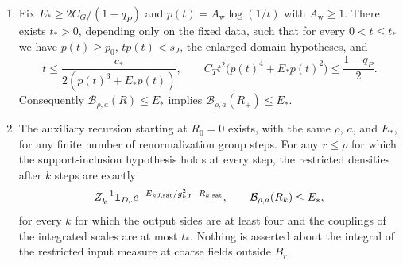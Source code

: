 \begin{theorem}
\begin{enumerate}
\begin{equation}\label{ch10:eq:recursion-domain}
 0<t\le\frac{c_*}{2(p^3+\epsilon p)}.
\end{equation}
Then, with $R_{\mathrm{aux}}=c_*/(p^3+\epsilon p)$, for every complex $\zeta$ with $\abs\zeta\le R_{\mathrm{aux}}$ and every $w\in\Omega_p$ the variables $\zeta\lambda_iw_i$ lie in the enlarged product of \cref{ch10:thm:whole-image-gauge}, the conditions \eqref{ch09:eq:sequential-conditions} hold at $(t,p)$, and the supported families of the auxiliary interaction and of the inserted interaction constructed in the proof lie in the ball of radius $\eta_0/2$ of \cref{ch09:thm:supported-log-holomorphy}. Under these conditions, apart from the field-independent factor $A_{\mathrm{coord}}$, the output effective interaction is
\begin{equation}\label{ch10:eq:one-step-recursion}
 R_+=Q_{d_0,J}^{\mathrm w}+\mathcal P_\delta R+\mathcal D_JR,\qquad
 \mathcal B_{\rho,a}(R_+)\le C_G+q_P\epsilon+C_Tt^2\epsilon(p^4+\epsilon p^2).
\end{equation}
Here $\mathcal P_\delta R(\theta)=R(e^{\varphi_\theta(0)})=R(e^{\delta\overline A_{d_0,J}(\theta)})$ is the pullback at the zero-fluctuation reconstruction, $\mathcal D_JR$ is the difference of the logarithms of the fluctuation partition functions without and with the inserted interaction, as in \cref{ch09:lem:marked-insertion} at the parameter $t$, and $Q_{d_0,J}^{\mathrm w}$ is the effective interaction of \cref{ch09:thm:sequential-density}. The output $R_+$ is gauge invariant on $B_\rho$, invariant under translations, the spatial inversion, and constant color conjugations, and $DR_+(I)=0$. Coupling parameters internal to $R$ are held fixed when the auxiliary parameter varies.
\item Fix $E_*\ge2C_G/(1-q_P)$ and $p(t)=A_{\mathrm w}\log(1/t)$ with $A_{\mathrm w}\ge1$. There exists $t_*>0$, depending only on the fixed data, such that for every $0<t\le t_*$ we have $p(t)\ge p_0$, $tp(t)<s_J$, the enlarged-domain hypotheses, and
\[
 t\le\frac{c_*}{2(p(t)^3+E_*p(t))},\qquad C_Tt^2\bigl(p(t)^4+E_*p(t)^2\bigr)\le\frac{1-q_P}2.
\]
Consequently $\mathcal B_{\rho,a}(R)\le E_*$ implies $\mathcal B_{\rho,a}(R_+)\le E_*$.
\item The auxiliary recursion starting at $R_0=0$ exists, with the same $\rho$, $a$, and $E_*$, for any finite number of renormalization group steps. For any $r\le\rho$ for which the support-inclusion hypothesis holds at every step, the restricted densities after $k$ steps are exactly
\[
 Z_k^{-1}\mathbf 1_{D_r}e^{-E_{kJ,\mathrm{sat}}/g_{kJ}^2-R_{k,\mathrm{sat}}},\qquad \mathcal B_{\rho,a}(R_k)\le E_*,
\]
for every $k$ for which the output sides are at least four and the couplings of the integrated scales are at most $t_*$. Nothing is asserted about the integral of the restricted input measure at coarse fields outside $B_r$.
\end{enumerate}
\end{theorem}

